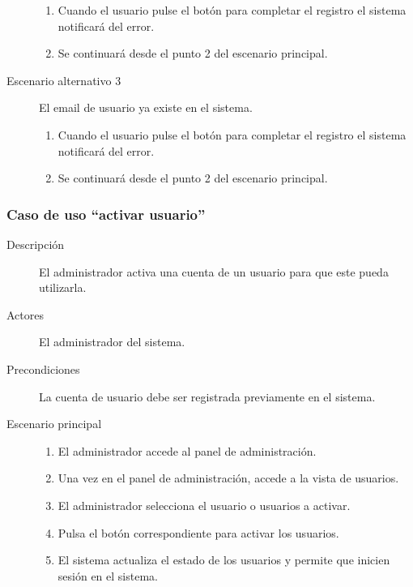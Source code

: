 \begin{description}
\begin{enumerate}
								\item Cuando el usuario pulse el botón para completar el registro el sistema notificará del error.
								\item Se continuará desde el punto 2 del escenario principal.
								\end{enumerate}
\item[Escenario alternativo 3]	El email de usuario ya existe en el sistema.
								\begin{enumerate}
								\item Cuando el usuario pulse el botón para completar el registro el sistema notificará del error.
								\item Se continuará desde el punto 2 del escenario principal.
								\end{enumerate}
\end{description}


\subsubsection{Caso de uso ``activar usuario''}
\begin{description}
\item[Descripción] 				El administrador activa una cuenta de un usuario para que este pueda utilizarla.
\item[Actores]					El administrador del sistema.
\item[Precondiciones]			La cuenta de usuario debe ser registrada previamente en el sistema.
\item[Escenario principal]	 	\hfill
								\begin{enumerate}
								\item El administrador accede al panel de administración.
								\item Una vez en el panel de administración, accede a la vista de usuarios.
								\item El administrador selecciona el usuario o usuarios a activar.
								\item Pulsa el botón correspondiente para activar los usuarios.
								\item El sistema actualiza el estado de los usuarios y permite que inicien sesión en el sistema.
								\end{enumerate}
\end{description}


